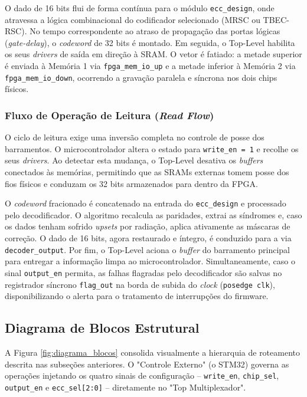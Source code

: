 \documentclass[12pt,a4paper]{article}
\begin{document}
O dado de 16 bits flui de forma contínua para o módulo \texttt{ecc\_design}, onde atravessa a lógica combinacional do codificador selecionado (MRSC ou TBEC-RSC). No tempo correspondente ao atraso de propagação das portas lógicas (\textit{gate-delay}), o \textit{codeword} de 32 bits é montado. Em seguida, o Top-Level habilita os seus \textit{drivers} de saída em direção à SRAM. O vetor é fatiado: a metade superior é enviada à Memória 1 via \texttt{fpga\_mem\_io\_up} e a metade inferior à Memória 2 via \texttt{fpga\_mem\_io\_down}, ocorrendo a gravação paralela e síncrona nos dois chips físicos.

\subsubsection{Fluxo de Operação de Leitura (\textit{Read Flow})}
O ciclo de leitura exige uma inversão completa no controle de posse dos barramentos. O microcontrolador altera o estado para \texttt{write\_en = 1} e recolhe os seus \textit{drivers}. Ao detectar esta mudança, o Top-Level desativa os \textit{buffers} conectados às memórias, permitindo que as SRAMs externas tomem posse dos fios físicos e conduzam os 32 bits armazenados para dentro da FPGA.

O \textit{codeword} fracionado é concatenado na entrada do \texttt{ecc\_design} e processado pelo decodificador. O algoritmo recalcula as paridades, extrai as síndromes e, caso os dados tenham sofrido \textit{upsets} por radiação, aplica ativamente as máscaras de correção. O dado de 16 bits, agora restaurado e íntegro, é conduzido para a via \texttt{decoder\_output}. Por fim, o Top-Level aciona o \textit{buffer} do barramento principal para entregar a informação limpa ao microcontrolador. Simultaneamente, caso o sinal \texttt{output\_en} permita, as falhas flagradas pelo decodificador são salvas no registrador síncrono \texttt{flag\_out} na borda de subida do \textit{clock} (\texttt{posedge clk}), disponibilizando o alerta para o tratamento de interrupções do firmware.

\subsection{Diagrama de Blocos Estrutural}

A Figura \ref{fig:diagrama_blocos} consolida visualmente a hierarquia de roteamento descrita nas subseções anteriores. O "Controle Externo" (o STM32) governa as operações injetando os quatro sinais de configuração -- \texttt{write\_en}, \texttt{chip\_sel}, \texttt{output\_en} e \texttt{ecc\_sel[2:0]} -- diretamente no "Top Multiplexador".
\end{document}
